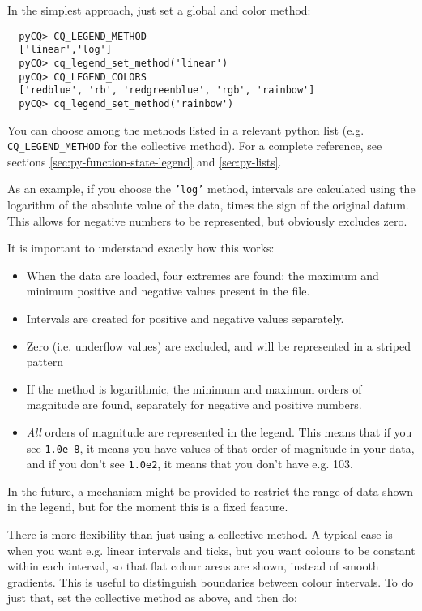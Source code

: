 \documentclass[a4paper,notitlepage,11pt]{article}
\begin{document}
In the simplest approach, just set a global and color method: 

\begin{verbatim}
  pyCQ> CQ_LEGEND_METHOD
  ['linear','log']
  pyCQ> cq_legend_set_method('linear')
  pyCQ> CQ_LEGEND_COLORS
  ['redblue', 'rb', 'redgreenblue', 'rgb', 'rainbow']
  pyCQ> cq_legend_set_method('rainbow')
\end{verbatim}

You can choose among the methods listed in a relevant python list (e.g. 
\texttt{CQ\_LEGEND\_METHOD} for the collective method). For a complete
reference, see sections \ref{sec:py-function-state-legend} and \ref{sec:py-lists}.

As an example, if you choose the \texttt{'log'} method, intervals are
calculated using the logarithm of the absolute value of the data, times the sign
of the original datum. This allows for negative numbers to be represented, but
obviously excludes zero. 

It is important to understand exactly how this works:

\begin{itemize}
  \item When the data are loaded, four extremes are found: the maximum and
  minimum positive and negative values present in the file.
  \item Intervals are created for positive and negative values separately.
  \item Zero (i.e. underflow values) are excluded, and will be represented in a
  striped pattern
  \item If the method is logarithmic, the minimum and maximum orders of
  magnitude are found, separately for negative and positive numbers.
  \item \emph{All} orders of magnitude are represented in the legend. This means
  that if you see \texttt{1.0e-8}, it means you have values of that order of
  magnitude in your data, and if you don't see \texttt{1.0e2}, it means that you
  don't have e.g. 103.
\end{itemize}

In the future, a mechanism might be provided to restrict the range of data shown
in the legend, but for the moment this is a fixed feature.

There is more flexibility than just using a collective method. A typical case is
when you want e.g. linear intervals and ticks, but you want colours to be
constant within each interval, so that flat colour areas are shown, instead of
smooth gradients. This is useful to distinguish boundaries between colour
intervals. To do just that, set the collective method as above, and then do:
\end{document}
